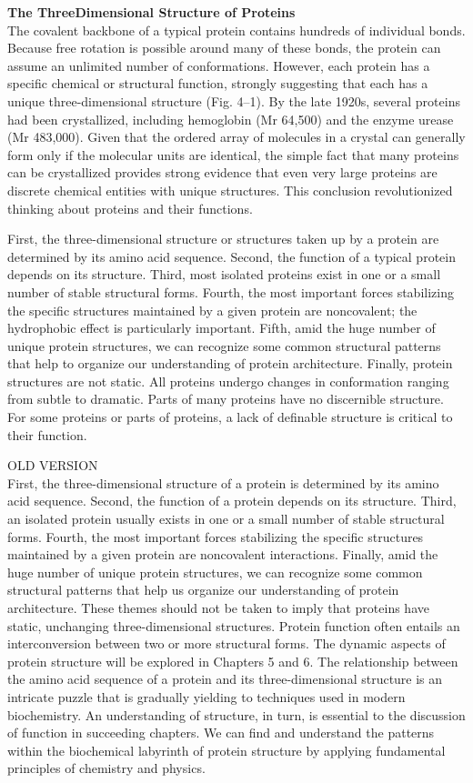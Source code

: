 \textbf{The ThreeDimensional Structure of Proteins}\\
The covalent backbone of a typical protein contains hundreds of individual bonds. Because free rotation is possible around many of these bonds, the protein can assume an unlimited number of conformations. However, each protein has a specific chemical or structural function, strongly suggesting that each has a unique three-dimensional structure (Fig. 4–1). By the late 1920s, several proteins had been crystallized, including hemoglobin (Mr 64,500) and the enzyme urease (Mr 483,000). Given that the ordered array of molecules in a crystal can generally form only if the molecular units are identical, the simple fact that many proteins can be crystallized provides strong evidence that even very large proteins are discrete chemical entities with unique structures. This conclusion revolutionized thinking about proteins and their functions.

 First, the three-dimensional structure or structures taken up by a protein are determined by its amino acid sequence. Second, the function of a typical protein depends on its structure. Third, most isolated proteins exist in one or a small number of stable structural forms. Fourth, the most important forces stabilizing the specific structures maintained by a given protein are noncovalent; the hydrophobic effect is particularly important. Fifth, amid the huge number of unique protein structures, we can recognize some common structural patterns that help to organize our understanding of protein architecture. Finally, protein structures are not static. All proteins undergo changes in conformation ranging from subtle to dramatic. Parts of many proteins have no discernible structure. For some proteins or parts of proteins, a lack of definable structure is critical to their function.

OLD VERSION\\
First, the three-dimensional structure of a protein is determined by its amino acid sequence. Second, the function of a protein depends on its structure. Third, an isolated protein usually exists in one or a small number of stable structural forms. Fourth, the most important forces stabilizing the specific structures maintained by a given protein are noncovalent interactions. Finally, amid the huge number of unique protein structures, we can recognize some common structural patterns that help us organize our understanding of protein architecture.
These themes should not be taken to imply that proteins have static, unchanging three-dimensional structures. Protein function often entails an interconversion between two or more structural forms. The dynamic aspects of protein structure will be explored in Chapters 5 and 6.
The relationship between the amino acid sequence of a protein and its three-dimensional structure is an intricate puzzle that is gradually yielding to techniques used in modern biochemistry. An understanding of structure, in turn, is essential to the discussion of function in succeeding chapters. We can find and understand the patterns within the biochemical labyrinth of protein structure by applying fundamental principles of chemistry and physics.

